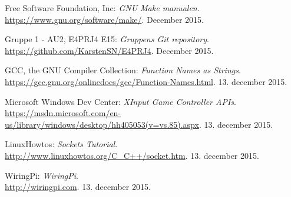 \begin{thebibliography}{2}
 Free Software Foundation, Inc: \textit{GNU Make manualen}. \\
\url{https://www.gnu.org/software/make/}. December 2015.

 Gruppe 1 - AU2, E4PRJ4 E15: \textit{Gruppens Git repository}. \\
\url{https://github.com/KarstenSN/E4PRJ4}. December 2015.

 GCC, the GNU Compiler Collection: \textit{Function Names as Strings}. \\
\url{https://gcc.gnu.org/onlinedocs/gcc/Function-Names.html}. 13. december 2015.

 Microsoft Windows Dev Center: \textit{XInput Game Controller APIs}. \\
\url{https://msdn.microsoft.com/en-us/library/windows/desktop/hh405053(v=vs.85).aspx}. 13. december 2015.

 LinuxHowtos: \textit{Sockets Tutorial}. \\
\url{http://www.linuxhowtos.org/C_C++/socket.htm}. 13. december 2015.


 WiringPi: \textit{WiringPi}. \\
\url{http://wiringpi.com}. 13. december 2015.

\end{thebibliography}